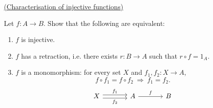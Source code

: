 \bigskip
\noindent{}\quad\underline{(Characterisation of injective functions)}

\noindent Let $f:A\longrightarrow B$. Show that the following are equivalent:
\begin{enumerate}
\item[a)] $f$ is injective.
\item[b)] $f$ has a retraction, i.e. there exists $r:B\longrightarrow A$
 such that $r\circ f=1_A$.
\item[c)] $f$ is a monomorphism: for every set $X$ and
 $f_1,f_2:X\longrightarrow A$,
 \[
 f\circ f_1=f\circ f_2\ \Longrightarrow\ f_1=f_2.
 \]
 \[
 \begin{tikzcd}[column sep=large]
 X \arrow[r, shift left=.55ex, "f_1"]
   \arrow[r, shift right=.55ex, "f_2"']
 & A \arrow[r, "f"] & B
 \end{tikzcd}
 \]
\end{enumerate}
